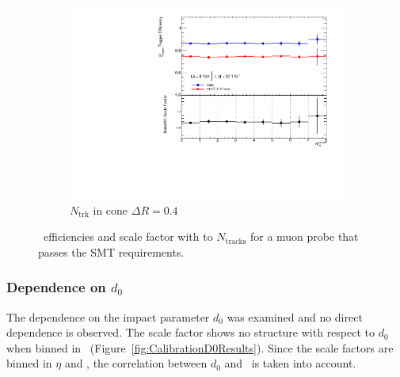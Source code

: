 \begin{figure}[htbp]
    \begin{subfigure}[b]{0.54\textwidth}
      \includegraphics[width=\textwidth]{PartCalibration2012/Plots/SFPlots/nucone40_smt.pdf}
      \caption{$N_{\textrm{trk}}$ in cone $\Delta R=0.4$}\label{fig:CalibrationIsoNucone40}
    \end{subfigure}
  \caption{\xsd\ efficiencies and scale factor with to $N_{\textrm{tracks}}$ for a muon probe that passes the SMT requirements.}\label{fig:CalibrationIsoNucone}
\end{figure}

\subsubsection*{Dependence on $d_{0}$}

The dependence on the impact parameter $d_{0}$ was examined and no direct dependence is observed. The scale factor shows no structure with respect to $d_{0}$ when binned in \pt\ (Figure~\ref{fig:CalibrationD0Results}). Since the scale factors are binned in $\eta$ and \pt, the correlation between $d_{0}$ and \pt\ is taken into account.

